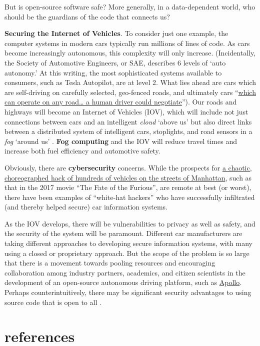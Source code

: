 \documentclass[openany]{book}
\begin{document}
But is open-source software safe? More generally, in a data-dependent world, who should be the guardians of the code that connects us?

\textbf{Securing the Internet of Vehicles}. To consider just one example, the computer systems in modern cars typically run millions of lines of code. As cars become increasingly autonomous, this complexity will only increase. (Incidentally, the Society of Automotive Engineers, or SAE, describes 6 levels of `auto autonomy.' At this writing, the most sophisticated systems available to consumers, such as Tesla Autopilot, are at level 2. What lies ahead are cars which are self-driving on carefully selected, geo-fenced roads, and ultimately cars ``\href{https://www.caranddriver.com/features/a15079828/autonomous-self-driving-car-levels-car-levels/}{which can operate on any road\ldots{} a human driver could negotiate}''). Our roads and highways will become an Internet of Vehicles (IOV), which will include not just connections between cars and an intelligent \emph{cloud} `above us' but also direct links between a distributed system of intelligent cars, stoplights, and road sensors in a \emph{fog} `around us' \citep{bonomi2012fog}. \textbf{Fog computing} and the IOV will reduce travel times and increase both fuel efficiency and automotive safety.

Obviously, there are \textbf{cybersecurity} concerns. While the prospects for \href{https://www.youtube.com/watch?v=OvewYslou9g}{a chaotic, choreographed hack of hundreds of vehicles on the streets of Manhattan}, such as that in the 2017 movie ``The Fate of the Furious'', are remote at best (or worst), there have been examples of ``white-hat hackers'' who have successfully infiltrated (and thereby helped secure) car information systems.

As the IOV develops, there will be vulnerabilities to privacy as well as safety, and the security of the system will be paramount. Different car manufacturers are taking different approaches to developing secure information systems, with many using a closed or proprietary approach. But the scope of the problem is so large that there is a movement towards pooling resources and encouraging collaboration among industry partners, academics, and citizen scientists in the development of an open-source autonomous driving platform, such as \href{http://apollo.auto/}{Apollo}. Perhaps counterintuitively, there may be significant security advantages to using source code that is open to all \citep{clarke2009open, fitzgerald2016open}.

\hypertarget{references}{%
\chapter{references}\label{references}}


\end{document}
